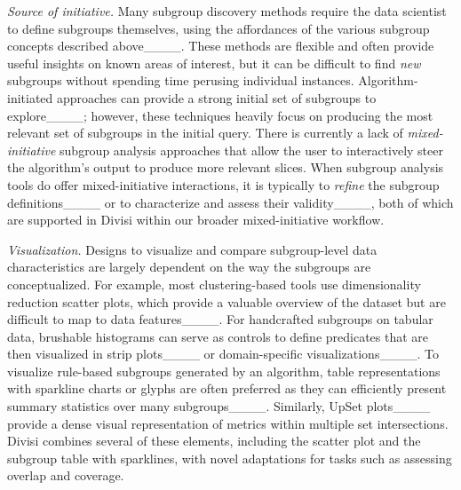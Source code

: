 \textit{Source of initiative.} Many subgroup discovery methods require the data scientist to define subgroups themselves, using the affordances of the various subgroup concepts described above____. 
These methods are flexible and often provide useful insights on known areas of interest, but it can be difficult to find \textit{new} subgroups without spending time perusing individual instances. 
Algorithm-initiated approaches can provide a strong initial set of subgroups to explore____; however, these techniques heavily focus on producing the most relevant set of subgroups in the initial query.
There is currently a lack of \textit{mixed-initiative} subgroup analysis approaches that allow the user to interactively steer the algorithm's output to produce more relevant slices.
When subgroup analysis tools do offer mixed-initiative interactions, it is typically to \textit{refine} the subgroup definitions____ or to characterize and assess their validity____, both of which are supported in Divisi within our broader mixed-initiative workflow.

\textit{Visualization.} Designs to visualize and compare subgroup-level data characteristics are largely dependent on the way the subgroups are conceptualized.
For example, most clustering-based tools use dimensionality reduction scatter plots, which provide a valuable overview of the dataset but are difficult to map to data features____.
For handcrafted subgroups on tabular data, brushable histograms can serve as controls to define predicates that are then visualized in strip plots____ or domain-specific visualizations____.
To visualize rule-based subgroups generated by an algorithm, table representations with sparkline charts or glyphs are often preferred as they can efficiently present summary statistics over many subgroups____.
Similarly, UpSet plots____ provide a dense visual representation of metrics within multiple set intersections.
Divisi combines several of these elements, including the scatter plot and the subgroup table with sparklines, with novel adaptations for tasks such as assessing overlap and coverage.

